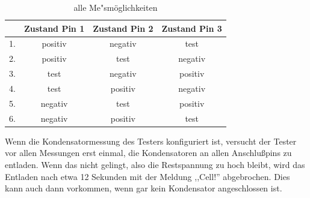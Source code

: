 \begin{table}[H]
  \begin{center}
    \begin{tabular}{| l | c | c | c |}
    \hline
      & Zustand Pin 1 & Zustand Pin 2 & Zustand Pin 3 \\
    \hline
   1. & positiv    &  negativ   &  test \\
   2. & positiv    &  test      & negativ \\
   3. & test       &  negativ   & positiv \\
   4. & test       &  positiv   & negativ \\
   5. & negativ    &  test      & positiv \\
   6. & negativ    &  positiv   &  test  \\
    \hline
    \end{tabular}
  \end{center}
  \caption{alle Me"sm\"oglichkeiten}
  \label{tab:case} 
\end{table}

Wenn die Kondensatormessung des Testers konfiguriert ist, versucht der Tester vor allen Messungen erst einmal,
die Kondensatoren an allen Anschlußpins zu entladen. Wenn das nicht gelingt, also die Restspannung zu hoch bleibt,
wird das Entladen nach etwa 12 Sekunden mit der Meldung ,,Cell!'' abgebrochen. Dies kann auch dann vorkommen, wenn
gar kein Kondensator angeschlossen ist.
